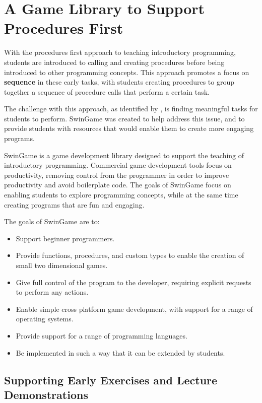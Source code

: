 

\section{A Game Library to Support Procedures First} %
\label{sec:swingame}

With the procedures first approach to teaching introductory programming, students are introduced to calling and creating procedures before being introduced to other programming concepts. This approach promotes a focus on \textbf{sequence} in these early tasks, with students creating procedures to group together a sequence of procedure calls that perform a certain task. 

The challenge with this approach, as identified by \citet{Pattis:1993}, is finding meaningful tasks for students to perform. SwinGame was created to help address this issue, and to provide students with resources that would enable them to create more engaging programs.

SwinGame is a game development library designed to support the teaching of introductory programming. Commercial game development tools focus on productivity, removing control from the programmer in order to improve productivity and avoid boilerplate code. The goals of SwinGame focus on enabling students to explore programming concepts, while at the same time creating programs that are fun and engaging. 

The goals of SwinGame are to:
\begin{itemize}[noitemsep, nolistsep]
   \item Support beginner programmers.
   \item Provide functions, procedures, and custom types to enable the creation of small two dimensional games.
   \item Give full control of the program to the developer, requiring explicit requests to perform any actions.
   \item Enable simple cross platform game development, with support for a range of operating systems.
   \item Provide support for a range of programming languages.
   \item Be implemented in such a way that it can be extended by students.
\end{itemize} 


\subsection{Supporting Early Exercises and Lecture Demonstrations} %
\label{sub:supporting_early_exercises}

